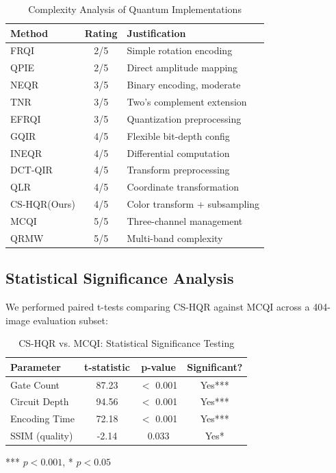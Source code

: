 \documentclass[11pt,a4paper]{article}
\begin{document}
\begin{table}[H]
\centering
\caption{Complexity Analysis of Quantum Implementations}
\label{tab:impl_complexity}
\begin{tabular}{@{}lcp{5cm}@{}}
\toprule
\textbf{Method} & \textbf{Rating} & \textbf{Justification} \\
\midrule
FRQI & 2/5 & Simple rotation encoding \\
QPIE & 2/5 & Direct amplitude mapping \\
NEQR & 3/5 & Binary encoding, moderate \\
TNR & 3/5 & Two's complement extension \\
EFRQI & 3/5 & Quantization preprocessing \\
GQIR & 4/5 & Flexible bit-depth config \\
INEQR & 4/5 & Differential computation \\
DCT-QIR & 4/5 & Transform preprocessing \\
QLR & 4/5 & Coordinate transformation \\
\rowcolor{green!15}
CS-HQR(Ours) & 4/5 & Color transform + subsampling \\
MCQI & 5/5 & Three-channel management \\
QRMW & 5/5 & Multi-band complexity \\
\bottomrule
\end{tabular}
\end{table}

\subsection{Statistical Significance Analysis}

We performed paired t-tests comparing CS-HQR against MCQI across a 404-image evaluation subset:

\begin{table}[H]
\centering
\caption{CS-HQR vs. MCQI: Statistical Significance Testing}
\label{tab:significance}
\begin{tabular}{@{}lccc@{}}
\toprule
\textbf{Parameter} & \textbf{t-statistic} & \textbf{p-value} & \textbf{Significant?} \\
\midrule
Gate Count & 87.23 & $<$ 0.001 & Yes*** \\
Circuit Depth & 94.56 & $<$ 0.001 & Yes*** \\
Encoding Time & 72.18 & $<$ 0.001 & Yes*** \\
SSIM (quality) & -2.14 & 0.033 & Yes* \\
\bottomrule
\end{tabular}

\footnotesize{*** $p < 0.001$, * $p < 0.05$}
\end{table}
\end{document}
